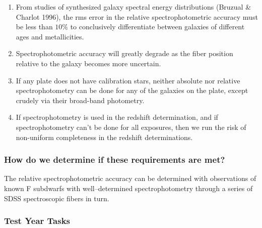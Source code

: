\begin{enumerate}

\item From studies of synthesized galaxy spectral energy distributions
(Bruzual \& Charlot 1996), the rms error in the relative
spectrophotometric accuracy must be less than $10\%$ to conclusively
differentiate between galaxies of different ages and
metallicities. 

\item Spectrophotometric accuracy will greatly degrade as the fiber
position relative to the galaxy becomes more uncertain. 

\item If any plate does not have calibration stars, neither absolute
nor relative spectrophotometry can be done for any of the galaxies on
the plate, except crudely via their broad-band photometry. 

\item If spectrophotometry is used in the redshift determination, and
if spectrophotometry can't be done for all exposures, then we run the
risk of non-uniform completeness in the redshift determinations.

\end{enumerate}

\subsubsection{How do we determine if these requirements are met?}

The relative spectrophotometric accuracy can be determined with
observations of known F subdwarfs with well--determined
spectrophotometry through a series of SDSS spectroscopic fibers in
turn.


\subsubsection{Test Year Tasks}

